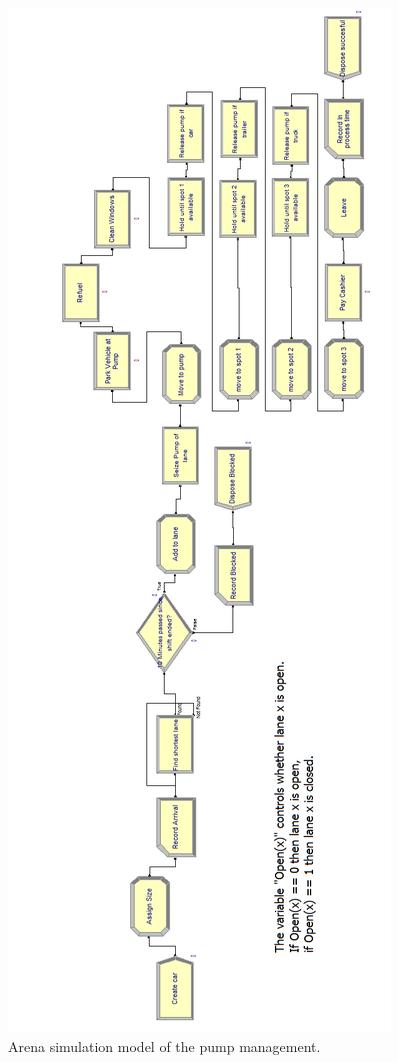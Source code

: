 \clearpage

\begin{figure}[!ht]
\begin{center}
	\includegraphics[scale=0.3]{images/model-description/model-pump-management.PNG}
	\caption{Arena simulation model of the pump management.}
	\label{fig:modelpumps}
\end{center}
\end{figure}